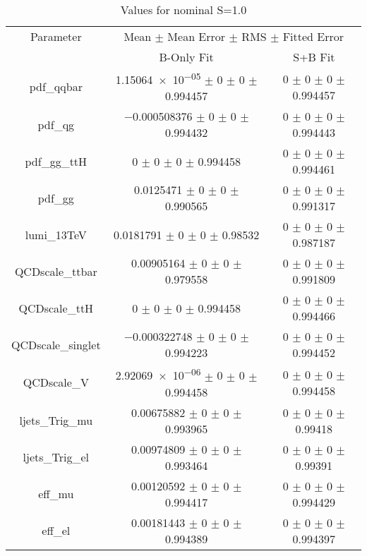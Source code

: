 \begin{table}
\centering
\caption{Values for nominal S=1.0}
\begin{tabular}{ccc}
\toprule
Parameter & \multicolumn{2}{c}{Mean $\pm$ Mean Error $\pm$ RMS $\pm$ Fitted Error}\\
 & B-Only Fit & S+B Fit\\
\midrule
pdf\_qqbar & \num{1.15064e-05} $\pm$ \num{0} $\pm$ \num{0} $\pm$ \num{0.994457} & \num{0} $\pm$ \num{0} $\pm$ \num{0} $\pm$ \num{0.994457}\\
pdf\_qg & \num{-0.000508376} $\pm$ \num{0} $\pm$ \num{0} $\pm$ \num{0.994432} & \num{0} $\pm$ \num{0} $\pm$ \num{0} $\pm$ \num{0.994443}\\
pdf\_gg\_ttH & \num{0} $\pm$ \num{0} $\pm$ \num{0} $\pm$ \num{0.994458} & \num{0} $\pm$ \num{0} $\pm$ \num{0} $\pm$ \num{0.994461}\\
pdf\_gg & \num{0.0125471} $\pm$ \num{0} $\pm$ \num{0} $\pm$ \num{0.990565} & \num{0} $\pm$ \num{0} $\pm$ \num{0} $\pm$ \num{0.991317}\\
lumi\_13TeV & \num{0.0181791} $\pm$ \num{0} $\pm$ \num{0} $\pm$ \num{0.98532} & \num{0} $\pm$ \num{0} $\pm$ \num{0} $\pm$ \num{0.987187}\\
QCDscale\_ttbar & \num{0.00905164} $\pm$ \num{0} $\pm$ \num{0} $\pm$ \num{0.979558} & \num{0} $\pm$ \num{0} $\pm$ \num{0} $\pm$ \num{0.991809}\\
QCDscale\_ttH & \num{0} $\pm$ \num{0} $\pm$ \num{0} $\pm$ \num{0.994458} & \num{0} $\pm$ \num{0} $\pm$ \num{0} $\pm$ \num{0.994466}\\
QCDscale\_singlet & \num{-0.000322748} $\pm$ \num{0} $\pm$ \num{0} $\pm$ \num{0.994223} & \num{0} $\pm$ \num{0} $\pm$ \num{0} $\pm$ \num{0.994452}\\
QCDscale\_V & \num{2.92069e-06} $\pm$ \num{0} $\pm$ \num{0} $\pm$ \num{0.994458} & \num{0} $\pm$ \num{0} $\pm$ \num{0} $\pm$ \num{0.994458}\\
ljets\_Trig\_mu & \num{0.00675882} $\pm$ \num{0} $\pm$ \num{0} $\pm$ \num{0.993965} & \num{0} $\pm$ \num{0} $\pm$ \num{0} $\pm$ \num{0.99418}\\
ljets\_Trig\_el & \num{0.00974809} $\pm$ \num{0} $\pm$ \num{0} $\pm$ \num{0.993464} & \num{0} $\pm$ \num{0} $\pm$ \num{0} $\pm$ \num{0.99391}\\
eff\_mu & \num{0.00120592} $\pm$ \num{0} $\pm$ \num{0} $\pm$ \num{0.994417} & \num{0} $\pm$ \num{0} $\pm$ \num{0} $\pm$ \num{0.994429}\\
eff\_el & \num{0.00181443} $\pm$ \num{0} $\pm$ \num{0} $\pm$ \num{0.994389} & \num{0} $\pm$ \num{0} $\pm$ \num{0} $\pm$ \num{0.994397}\\

\end{tabular}
\end{table}
